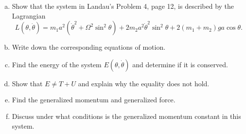 \documentclass[12pt]{article}
\newenvironment{problem}[2][Problem]{\begin{trivlist}
\item[\hskip \labelsep {\bfseries #1}\hskip \labelsep {\bfseries #2.}]}{\end{trivlist}}
\begin{document}
\begin{problem}{3}
\begin{enumerate}[(a)]
\item Show that the system in Landau's Problem 4, page 12,  is described by the Lagrangian
\begin{equation}
L(\theta,\dot{\theta})=m_1 a^2(\dot{\theta}^2+\Omega^2\sin^2\theta)+2m_2 a^2 \dot{\theta}^2 \sin^2\theta+2(m_1+m_2)g a \cos\theta.
\end{equation}
\item Write down the corresponding equations of motion.
\item Find the energy of the system $E(\theta,\dot{\theta})$ and determine if it is conserved.
\item Show that $E\neq T+U$ and explain why the equality does not hold.
\item Find the generalized momentum and generalized force.
\item Discuss under what conditions is the generalized momentum constant in this system.
\end{enumerate}
\end{problem}
\newpage
\end{document}
